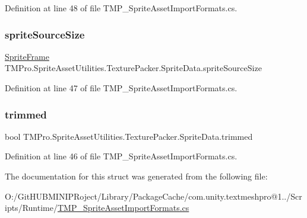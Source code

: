 Definition at line 48 of file T\+M\+P\+\_\+\+Sprite\+Asset\+Import\+Formats.\+cs.

\mbox{\label{struct_t_m_pro_1_1_sprite_asset_utilities_1_1_texture_packer_1_1_sprite_data_a594b760a42f7cd378fd430afbf7b54dc}} 
\subsubsection{\texorpdfstring{spriteSourceSize}{spriteSourceSize}}
{\footnotesize\ttfamily \mbox{\hyperlink{struct_t_m_pro_1_1_sprite_asset_utilities_1_1_texture_packer_1_1_sprite_frame}{Sprite\+Frame}} T\+M\+Pro.\+Sprite\+Asset\+Utilities.\+Texture\+Packer.\+Sprite\+Data.\+sprite\+Source\+Size}



Definition at line 47 of file T\+M\+P\+\_\+\+Sprite\+Asset\+Import\+Formats.\+cs.

\mbox{\label{struct_t_m_pro_1_1_sprite_asset_utilities_1_1_texture_packer_1_1_sprite_data_ad116f66559d6d367b914cbd3c1bb2833}} 
\subsubsection{\texorpdfstring{trimmed}{trimmed}}
{\footnotesize\ttfamily bool T\+M\+Pro.\+Sprite\+Asset\+Utilities.\+Texture\+Packer.\+Sprite\+Data.\+trimmed}



Definition at line 46 of file T\+M\+P\+\_\+\+Sprite\+Asset\+Import\+Formats.\+cs.



The documentation for this struct was generated from the following file\+:\begin{DoxyCompactItemize}
\item 
O\+:/\+Git\+H\+U\+B\+M\+I\+N\+I\+P\+Roject/\+Library/\+Package\+Cache/com.\+unity.\+textmeshpro@1../\+Scripts/\+Runtime/\mbox{\hyperlink{_t_m_p___sprite_asset_import_formats_8cs}{T\+M\+P\+\_\+\+Sprite\+Asset\+Import\+Formats.\+cs}}\end{DoxyCompactItemize}
